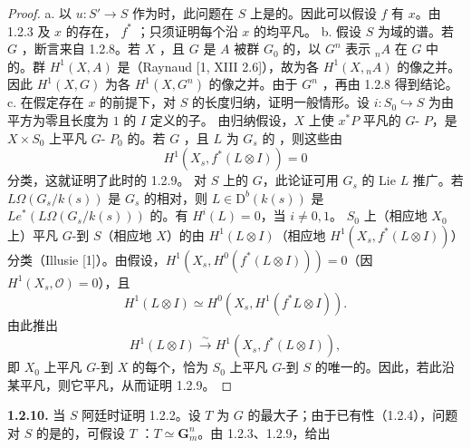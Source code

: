 \begin{proof}
a. 以 $u:S'\to S$ 作为时，此问题在 $S$ 上是的。因此可以假设 $f$ 有 $x$。由 1.2.3 及 $x$ 的存在， $f^*$ ；只须证明每个沿 $x$ 的均平凡。
b. 假设 $S$ 为域的谱。若 $G$ ，断言来自 1.2.8。若 $X$ ，且 $G$ 是 $A$ 被群 $G_0$ 的，以 $G^n$ 表示 ${}_nA$ 在 $G$ 中的。群 $H^1(X,A)$ 是（Raynaud [1, XIII 2.6]），故为各 $H^1(X,{}_nA)$ 的像之并。因此 $H^1(X,G)$ 为各 $H^1(X,G^n)$ 的像之并。由于 $G^n$ ，再由 1.2.8 得到结论。
c. 在假定存在 $x$ 的前提下，对 $S$ 的长度归纳，证明一般情形。设 $i:S_0\hookrightarrow S$ 为由平方为零且长度为 $1$ 的 $I$ 定义的子。
由归纳假设，$X$ 上使 $x^*P$ 平凡的 $G$- $P$，是 $X\times S_0$ 上平凡 $G$- $P_0$ 的。若 $G$ ，且 $L$ 为 $G_s$ 的 ，则这些由
\[H^1(X_s,f^*(L\otimes I))=0\]
分类，这就证明了此时的 1.2.9。
对 $S$ 上的 $G$，此论证可用 $G_s$ 的 Lie  $L$ 推广。若 $L\Omega(G_s/k(s))$ 是 $G_s$ 的相对，则 $L\in\mathrm D^b(k(s))$ 是 $Le^*(L\Omega(G_s/k(s)))$ 的。有 $H^i(L)=0$，当 $i\ne0,1$。
$S_0$ 上（相应地 $X_0$ 上）平凡 $G$-到 $S$（相应地 $X$）的由 $H^1(L\otimes I)$（相应地 $H^1(X_s,f^*(L\otimes I))$）分类（Illusie [1]）。由假设，$H^1(X_s,H^0(f^*(L\otimes I)))=0$（因 $H^1(X_s,\mathscr O)=0$），且
\[H^1(L\otimes I)\simeq H^0(X_s,H^1(f^*L\otimes I)).\]
由此推出
\[H^1(L\otimes I)\xrightarrow\sim H^1(X_s,f^*(L\otimes I)),\]
即 $X_0$ 上平凡 $G$-到 $X$ 的每个，恰为 $S_0$ 上平凡 $G$-到 $S$ 的唯一的。因此，若此沿某平凡，则它平凡，从而证明 1.2.9。
\end{proof}
\textbf{1.2.10.} 当 $S$ 阿廷时证明 1.2.2。设 $T$ 为 $G$ 的最大子；由于已有性（1.2.4），问题对 $S$ 的是的，可假设 $T$ ：$T\simeq\mathbf G_m^n$。由 1.2.3、1.2.9，给出
